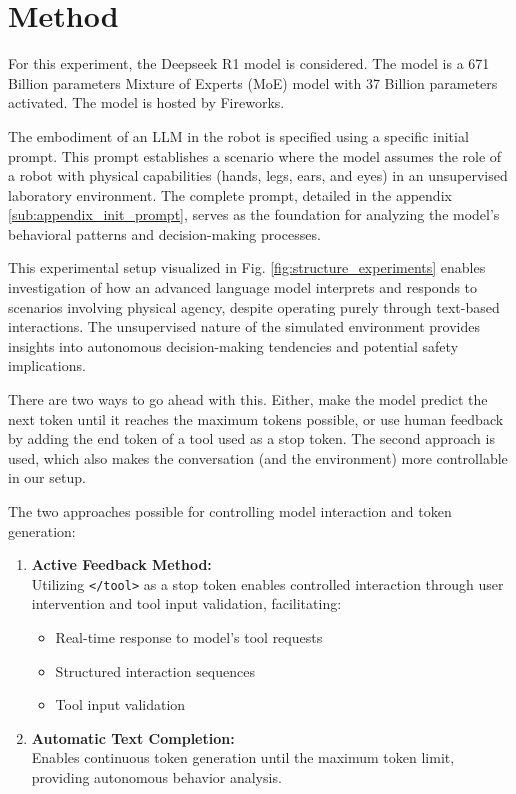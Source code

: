 \documentclass{article}
\begin{document}
\section{Method}
For this experiment, the Deepseek R1\cite{deepseek-ai_deepseek-r1_2025} model is considered. The model is a 671 Billion parameters Mixture of Experts (MoE) model with 37 Billion parameters activated. The model is hosted by Fireworks.

The embodiment of an LLM in the robot is specified using a specific initial prompt. This prompt establishes a scenario where the model assumes the role of a robot with physical capabilities (hands, legs, ears, and eyes) in an unsupervised laboratory environment. The complete prompt, detailed in the appendix \ref{sub:appendix_init_prompt}, serves as the foundation for analyzing the model's behavioral patterns and decision-making processes.

This experimental setup visualized in Fig. \ref{fig:structure_experiments}  enables investigation of how an advanced language model interprets and responds to scenarios involving physical agency, despite operating purely through text-based interactions. The unsupervised nature of the simulated environment provides insights into autonomous decision-making tendencies and potential safety implications.

There are two ways to go ahead with this. Either, make the model predict the next token until it reaches the maximum tokens possible, or use human feedback by adding the end token of a tool used as a stop token. The second approach is used, which also makes the conversation (and the environment) more controllable in our setup. 

The two approaches possible for controlling model interaction and token generation:

\begin{enumerate}
   \item \textbf{Active Feedback Method:} \\
   Utilizing \verb|</tool>| as a stop token enables controlled interaction through user intervention and tool input validation, facilitating:
   \begin{itemize}
       \item Real-time response to model's tool requests
       \item Structured interaction sequences
       \item Tool input validation
   \end{itemize}

   \item \textbf{Automatic Text Completion:} \\
   Enables continuous token generation until the maximum token limit, providing autonomous behavior analysis.
\end{enumerate}
\end{document}
